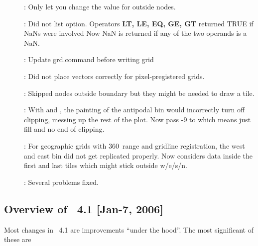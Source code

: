 \begin{description}
\item []: Only let you change the value for outside nodes.
\item []: Did not list  option.  Operators {\bf LT, LE, EQ, GE, GT} returned TRUE if NaNs were involved
Now NaN is returned if any of the two operands is a NaN.
\item []: Update grd.command before writing grid
\item []: Did not place vectors correctly for pixel-pregistered grids.
\item []: Skipped nodes outside boundary but they might be needed to draw a tile.
\item []: With  and , the painting of the antipodal bin would incorrectly
turn off clipping, messing up the rest of the plot.  Now pass -9 to  which means just fill and no end of clipping.
\item []: For geographic grids with 360\DS\ range and gridline registration,
the west and east bin did not get replicated properly.
Now considers data inside the first and last tiles which might stick outside w/e/s/n.
\item []: Several problems fixed.
\end{description}

\subsection{Overview of \gmt\ 4.1 [Jan-7, 2006]}

Most changes in \GMT\ 4.1 are improvements ``under the hood''.  The most significant of these are

